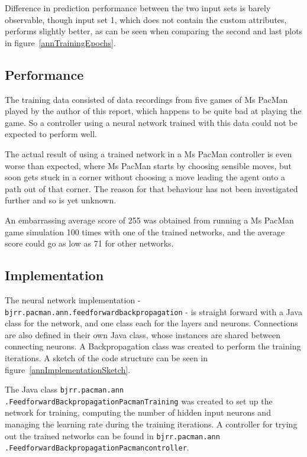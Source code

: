 \documentclass[conference]{IEEEtran}
\begin{document}
Difference in prediction performance between the two input sets is barely observable, though input set 1, which does not contain the custom attributes, performs slightly better, as can be seen when comparing the second and last plots in figure~\ref{annTrainingEpochs}.


\subsection{Performance}

The training data consisted of data recordings from five games of Ms PacMan played by the author of this report, which happens to be quite bad at playing the game.  So a controller using a neural network trained with this data could not be expected to perform well.  

The actual result of using a trained network in a Ms PacMan controller is even worse than expected, where Ms PacMan starts by choosing sensible moves, but soon gets stuck in a corner without choosing a move leading the agent onto a path out of that corner.  The reason for that behaviour has not been investigated further and so is yet unknown.

An embarrassing average score of 255 was obtained from running a Ms PacMan game simulation 100 times with one of the trained networks, and the average score could go as low as 71 for other networks.



\subsection{Implementation}
The neural network implementation - \texttt{bjrr.pacman.ann.feedforwardbackpropagation} - is straight forward with a Java class for the network, and one class each for the layers and neurons.  Connections are also defined in their own Java class, whose instances are shared between connecting neurons.  A Backpropagation class was created to perform the training iterations.  A sketch of the code structure can be seen in figure~\ref{annImplementationSketch}.

The Java class \texttt{bjrr.pacman.ann\\.FeedforwardBackpropagationPacmanTraining} was created to set up the network for training, computing the number of hidden input neurons and managing the learning rate during the training iterations.  A controller for trying out the trained networks can be found in \texttt{bjrr.pacman.ann\\.FeedforwardBackpropagationPacmancontroller}.
\end{document}
